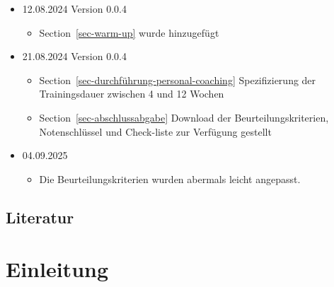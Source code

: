 \documentclass[
  letterpaper,
  DIV=11,
  numbers=noendperiod]{scrreprt}
\providecommand{\tightlist}{%
  \setlength{\itemsep}{0pt}\setlength{\parskip}{0pt}}
\begin{document}
\begin{itemize}
  \begin{itemize}
  \tightlist
  \item
    Chapter~\ref{sec-beurteilung} Punktevergabe überabeitet nach
    Feedback der Studierenden
  \item
    Chapter~\ref{sec-hintergrund_script} gekürzt
  \item
    Section~\ref{sec-abschlussabgabe} enthält eine Vorlage zum Download
    via Github
  \item
    Mentorship description hidden
  \item
    Section~\ref{sec-berufsbild} kurze Anmerkung zur Gesetzesnovelle,
    die im Juli 2024 beschlossen wurde
  \end{itemize}
\item
  12.08.2024 Version 0.0.4

  \begin{itemize}
  \tightlist
  \item
    Section~\ref{sec-warm-up} wurde hinzugefügt
  \end{itemize}
\item
  21.08.2024 Version 0.0.4

  \begin{itemize}
  \tightlist
  \item
    Section~\ref{sec-durchführung-personal-coaching} Spezifizierung der
    Trainingsdauer zwischen 4 und 12 Wochen
  \item
    Section~\ref{sec-abschlussabgabe} Download der
    Beurteilungskriterien, Notenschlüssel und Check-liste zur Verfügung
    gestellt
  \end{itemize}
\item
  04.09.2025

  \begin{itemize}
  \tightlist
  \item
    Die Beurteilungskriterien wurden abermals leicht angepasst.
  \end{itemize}
\end{itemize}

\section{Literatur}\label{literatur}


\chapter{Einleitung}\label{sec-einleitung}
\end{document}
